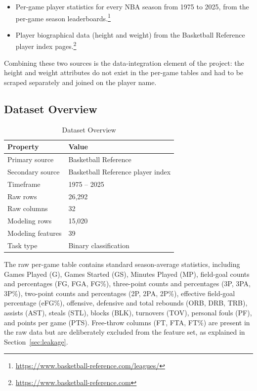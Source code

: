 \documentclass[conference]{IEEEtran}
\begin{document}
\begin{itemize}
\item Per-game player statistics for every NBA season from 1975 to 2025, from the per-game season leaderboards.\footnote{\url{https://www.basketball-reference.com/leagues/}}
\item Player biographical data (height and weight) from the Basketball Reference player index pages.\footnote{\url{https://www.basketball-reference.com}}
\end{itemize}

Combining these two sources is the data-integration element of the project: the height and weight attributes do not exist in the per-game tables and had to be scraped separately and joined on the player name.

\subsection{Dataset Overview}

\begin{table}[H]
\centering
\caption{Dataset Overview}
\begin{tabular}{|l|l|}
\hline
\textbf{Property} & \textbf{Value} \\
\hline
Primary source & Basketball Reference \\
\hline
Secondary source & Basketball Reference player index \\
\hline
Timeframe & 1975 -- 2025 \\
\hline
Raw rows & 26,292 \\
\hline
Raw columns & 32 \\
\hline
Modeling rows & 15,020 \\
\hline
Modeling features & 39 \\
\hline
Task type & Binary classification \\
\hline
\end{tabular}
\label{tab:dataset}
\end{table}

The raw per-game table contains standard season-average statistics, including Games Played (G), Games Started (GS), Minutes Played (MP), field-goal counts and percentages (FG, FGA, FG\%), three-point counts and percentages (3P, 3PA, 3P\%), two-point counts and percentages (2P, 2PA, 2P\%), effective field-goal percentage (eFG\%), offensive, defensive and total rebounds (ORB, DRB, TRB), assists (AST), steals (STL), blocks (BLK), turnovers (TOV), personal fouls (PF), and points per game (PTS). Free-throw columns (FT, FTA, FT\%) are present in the raw data but are deliberately excluded from the feature set, as explained in Section~\ref{sec:leakage}.
\end{document}
